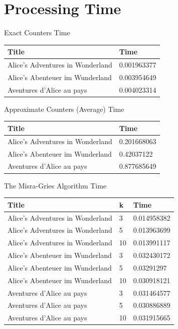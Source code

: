 \documentclass[]{revdetua}
\begin{document}
\section{Processing Time}

\begin{table}[!ht]
    \centering
    Exact Counters Time
    \begin{tabular}{|l|l|}
    \hline
        Title & Time \\ \hline
        Alice’s Adventures in Wonderland & 0.001963377 \\ \hline
        Alice's Abenteuer im Wunderland & 0.003954649 \\ \hline
        Aventures d'Alice au pays & 0.004023314 \\ \hline
    \end{tabular}
\end{table}

\begin{table}[!ht]
    \centering
    Approximate Counters (Average) Time
    \begin{tabular}{|l|l|}
    \hline
        Title & Time \\ \hline
        Alice’s Adventures in Wonderland & 0.201668063 \\ \hline
        Alice's Abenteuer im Wunderland & 0.42037122 \\ \hline
        Aventures d'Alice au pays & 0.877685649 \\ \hline
    \end{tabular}
\end{table}

\begin{table}[!ht]
    \centering
    The Misra-Gries Algorithm Time
    \begin{tabular}{|l|l|l|}
    \hline
        Title & k & Time \\ \hline
        Alice’s Adventures in Wonderland & 3 & 0.014958382 \\ \hline
        Alice’s Adventures in Wonderland & 5 & 0.013963699 \\ \hline
        Alice’s Adventures in Wonderland & 10 & 0.013991117 \\ \hline
        Alice's Abenteuer im Wunderland & 3 & 0.032430172 \\ \hline
        Alice's Abenteuer im Wunderland & 5 & 0.03291297 \\ \hline
        Alice's Abenteuer im Wunderland & 10 & 0.030918121 \\ \hline
        Aventures d'Alice au pays & 3 & 0.031464577 \\ \hline
        Aventures d'Alice au pays & 5 & 0.030886889 \\ \hline
        Aventures d'Alice au pays & 10 & 0.031915665 \\ \hline
    \end{tabular}
\end{table}
\end{document}
